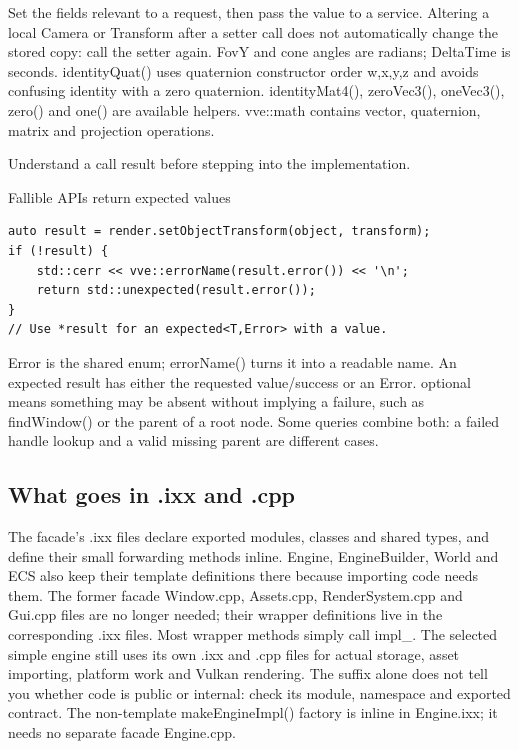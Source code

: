 \documentclass[11pt,a4paper]{article}
\begin{document}
Set the fields relevant to a request, then pass the value to a service. Altering a local Camera or Transform after a setter call does not automatically change the stored copy: call the setter again. FovY and cone angles are radians; DeltaTime is seconds. identityQuat() uses quaternion constructor order w,x,y,z and avoids confusing identity with a zero quaternion. identityMat4(), zeroVec3(), oneVec3(), zero() and one() are available helpers. vve::math contains vector, quaternion, matrix and projection operations.

\label{core-22}
Understand a call result before stepping into the implementation.

Fallible APIs return expected values

\begin{lstlisting}[language={}]
auto result = render.setObjectTransform(object, transform);
if (!result) {
    std::cerr << vve::errorName(result.error()) << '\n';
    return std::unexpected(result.error());
}
// Use *result for an expected<T,Error> with a value.
\end{lstlisting}

Error is the shared enum; errorName() turns it into a readable name. An expected result has either the requested value/success or an Error. optional means something may be absent without implying a failure, such as findWindow() or the parent of a root node. Some queries combine both: a failed handle lookup and a valid missing parent are different cases.

\subsection*{What goes in .ixx and .cpp}
The facade's .ixx files declare exported modules, classes and shared types, and define their small forwarding methods inline. Engine, EngineBuilder, World and ECS also keep their template definitions there because importing code needs them. The former facade Window.cpp, Assets.cpp, RenderSystem.cpp and Gui.cpp files are no longer needed; their wrapper definitions live in the corresponding .ixx files. Most wrapper methods simply call impl\_. The selected simple engine still uses its own .ixx and .cpp files for actual storage, asset importing, platform work and Vulkan rendering. The suffix alone does not tell you whether code is public or internal: check its module, namespace and exported contract. The non-template makeEngineImpl() factory is inline in Engine.ixx; it needs no separate facade Engine.cpp.
\end{document}
